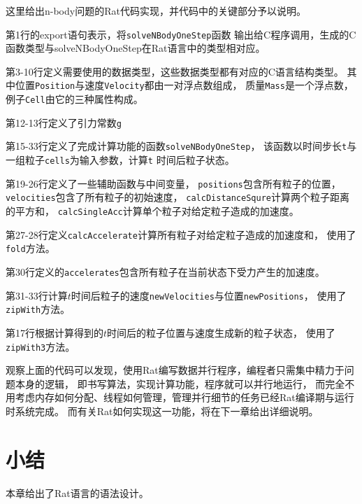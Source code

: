 这里给出n-body问题的Rat代码实现，并代码中的关键部分予以说明。
\begin{compactitem}
  \item 第1行的export语句表示，将\texttt{solveNBodyOneStep}函数
    输出给C程序调用，生成的C函数类型与solveNBodyOneStep在Rat语言中的类型相对应。
  \item 第3-10行定义需要使用的数据类型，这些数据类型都有对应的C语言结构类型。
    其中位置\texttt{Position}与速度\texttt{Velocity}都由一对浮点数组成，
    质量\texttt{Mass}是一个浮点数，例子\texttt{Cell}由它的三种属性构成。
  \item 第12-13行定义了引力常数\texttt{g}
  \item 第15-33行定义了完成计算功能的函数\texttt{solveNBodyOneStep}，
    该函数以时间步长\texttt{t}与一组粒子\texttt{cells}为输入参数，计算\texttt{t}
    时间后粒子状态。
    \begin{compactitem}
      \item 第19-26行定义了一些辅助函数与中间变量，
        \texttt{positions}包含所有粒子的位置，\texttt{velocities}包含了所有粒子的初始速度，
        \texttt{calcDistanceSqure}计算两个粒子距离的平方和，
        \texttt{calcSingleAcc}计算单个粒子对给定粒子造成的加速度。
      \item 第27-28行定义\texttt{calcAccelerate}计算所有粒子对给定粒子造成的加速度和，
        使用了\texttt{fold}方法。
      \item 第30行定义的\texttt{accelerates}包含所有粒子在当前状态下受力产生的加速度。
      \item 第31-33行计算$t$时间后粒子的速度\texttt{newVelocities}与位置\texttt{newPositions}，
        使用了\texttt{zipWith}方法。
      \item 第17行根据计算得到的$t$时间后的粒子位置与速度生成新的粒子状态，
        使用了\texttt{zipWith3}方法。
    \end{compactitem}
\end{compactitem}



观察上面的代码可以发现，使用Rat编写数据并行程序，编程者只需集中精力于问题本身的逻辑，
即书写算法，实现计算功能，程序就可以并行地运行，
而完全不用考虑内存如何分配、线程如何管理，管理并行细节的任务已经Rat编译期与运行时系统完成。
而有关Rat如何实现这一功能，将在下一章给出详细说明。

\section{小结}
本章给出了Rat语言的语法设计。

